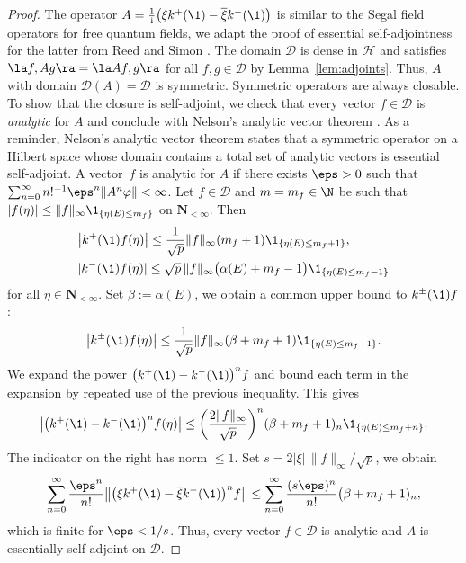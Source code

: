 \begin{proof}
	The operator $A = \frac{1}{\mathrm i} \bigl( \xi k^+(\1)- \overline{\xi} k^-(\1)\bigr)$ is similar to the Segal field operators for free quantum fields, we adapt the proof of essential self-adjointness for the latter from Reed and Simon \cite[Theorem X.41\,(a)]{reedSimonII}.
	The domain $\mathcal D$ is dense in $\mathcal H$ and satisfies $\la f, A g\ra = \la Af, g\ra$ for all $f,g\in \mathcal D$ by Lemma~\ref{lem:adjoints}. Thus, $A$ with domain $\mathcal D(A) = \mathcal D$ is symmetric. Symmetric operators are always closable. 	
	To show that the closure is self-adjoint, we check that every vector $f\in \mathcal D$ is \emph{analytic} for $A$ and conclude with Nelson's analytic vector theorem \cite[Theorem~X.39]{reedSimonII}.
 As a reminder, Nelson's analytic vector theorem states that a symmetric operator on a Hilbert space whose domain contains a total set of analytic vectors is essential self-adjoint.
 A vector~$f$ is analytic for $A$ if there exists $\eps>0$ such that $\sum_{n=0}^\infty n!^{-1} \eps^n \| A^n \varphi\|<\infty$.
	Let $f\in \mathcal D$ and $m=m_f\in \N$ be such that $|f(\eta)|\leq \|f\|_\infty \1_{\{\eta(E)\leq m_f\}}$ on $\mathbf N_{<\infty}$. Then
	\begin{align*}
		&\bigl| k^+(\1) f(\eta)\bigr| \leq \frac{1}{\sqrt p} \|f\|_\infty (m_f+1) \1_{\{\eta(E) \leq m_f+1\}},\\
		&| k^-(\1) f(\eta)| \leq \sqrt p\, \|f\|_\infty \bigl(\alpha(E)+m_f-1\bigr) \1_{\{\eta(E) \leq m_f-1\}}
	\end{align*} 	
	for all $\eta \in \mathbf N_{<\infty}$. Set $\beta:= \alpha(E)$, we obtain a common upper bound to $k^\pm(\1) f$:
	\[
		\bigl| k^\pm(\1) f(\eta)\bigr| \leq \frac{1}{\sqrt p} \|f\|_\infty (\beta +m_f+1) \1_{\{\eta(E) \leq m_f + 1\}}.
	\]
	We expand the power $\bigl(k^+(\1) - k^-(\1)\bigr)^n f$ and bound each term in the expansion by repeated use of the previous inequality. This gives
	\[
		\bigl| \bigl(k^+(\1) - k^-(\1)\bigr)^n f(\eta)\bigr| \leq \biggl(\frac{ 2 \| f\|_\infty}{\sqrt p}\biggr)^{n} ( \beta + m_f + 1)_n \1_{\{\eta(E)\leq m_f+n\}}.
	\] 	
	The indicator on the right has norm $\leq 1$. Set $s = 2|\xi|\, \|f\|_\infty/\sqrt p$, we obtain
	\[
		\sum_{n=0}^\infty \frac{\eps^n}{n!} \bigl\| \bigl(\xi k^+(\1) -\overline{\xi} k^-(\1)\bigr)^n f \bigr\|
			 \leq \sum_{n=0}^\infty \frac{(s\eps)^n}{n!} \bigl(\beta + m_f + 1)_n,
	\] 	
	which is finite for $\eps< 1/s$. Thus, every vector $f\in \mathcal D$ is analytic and $A$ is essentially self-adjoint on $\mathcal D$. 		
\end{proof}

